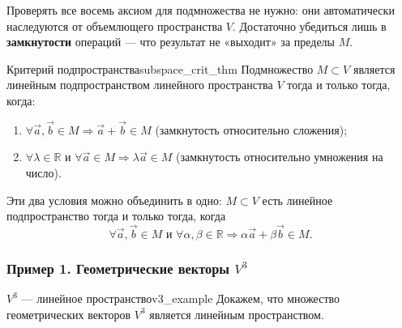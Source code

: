 \documentclass[12pt,a4paper]{article}
\begin{document}
Проверять все восемь аксиом для подмножества не нужно: они автоматически
наследуются от объемлющего пространства $V$. Достаточно убедиться лишь в
\textbf{замкнутости} операций — что результат не «выходит» за пределы $M$.

\begin{theorem}{Критерий подпространства}{subspace_crit_thm}
Подмножество $M \subset V$ является линейным подпространством линейного
пространства $V$ тогда и только тогда, когда:
\begin{enumerate}
\item $\forall \vec{a}, \vec{b} \in M \Rightarrow \vec{a} + \vec{b} \in M$
(замкнутость относительно сложения);
\item $\forall \lambda \in \mathbb{R}$ и
$\forall \vec{a} \in M \Rightarrow \lambda\vec{a} \in M$
(замкнутость относительно умножения на число).
\end{enumerate}
Эти два условия можно объединить в одно: $M \subset V$ есть линейное
подпространство тогда и только тогда, когда
\[
\forall \vec{a}, \vec{b} \in M \text{ и } \forall \alpha, \beta \in \mathbb{R}
\Rightarrow \alpha\vec{a} + \beta\vec{b} \in M.
\]
\end{theorem}

\subsubsection*{Пример 1. Геометрические векторы $V^3$}

\begin{definition}{$V^3$ — линейное пространство}{v3_example}
Докажем, что множество геометрических векторов $V^3$ является линейным
пространством.
\end{definition}
\end{document}
